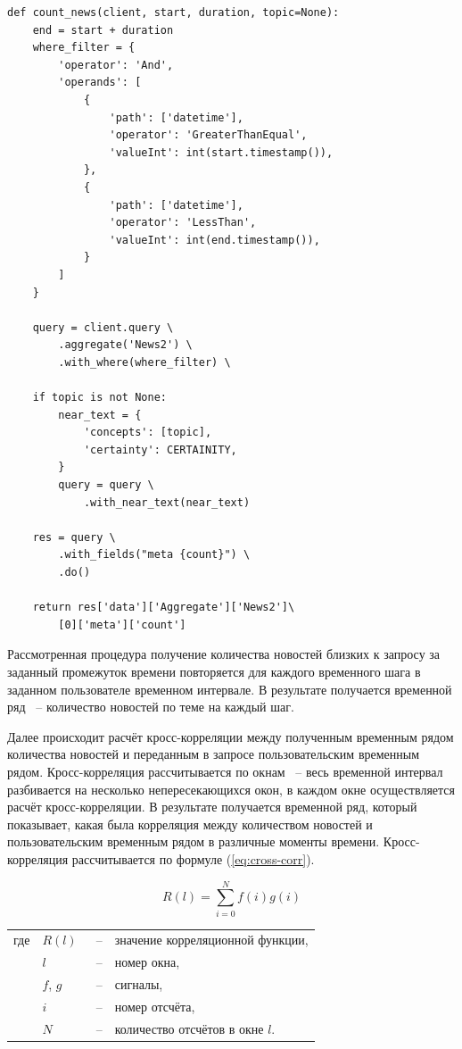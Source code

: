 \begin{lstlisting}
def count_news(client, start, duration, topic=None):
    end = start + duration
    where_filter = {
        'operator': 'And',
        'operands': [
            {
                'path': ['datetime'],
                'operator': 'GreaterThanEqual',
                'valueInt': int(start.timestamp()),
            },
            {
                'path': ['datetime'],
                'operator': 'LessThan',
                'valueInt': int(end.timestamp()),
            }
        ]
    }

    query = client.query \
        .aggregate('News2') \
        .with_where(where_filter) \

    if topic is not None:
        near_text = {
            'concepts': [topic],
            'certainty': CERTAINITY,
        }
        query = query \
            .with_near_text(near_text)

    res = query \
        .with_fields("meta {count}") \
        .do()

    return res['data']['Aggregate']['News2']\
        [0]['meta']['count']
\end{lstlisting}

Рассмотренная процедура получение количества новостей близких к запросу за заданный промежуток времени повторяется для каждого временного шага в заданном пользователе временном интервале. В результате получается временной ряд ~-- количество новостей по теме на каждый шаг.

Далее происходит расчёт кросс-корреляции между полученным временным рядом количества новостей и переданным в запросе пользовательским временным рядом. Кросс-корреляция рассчитывается по окнам ~-- весь временной интервал разбивается на несколько непересекающихся окон, в каждом окне осуществляется расчёт кросс-корреляции. В результате получается временной ряд, который показывает, какая была корреляция между количеством новостей и пользовательским временным рядом в различные моменты времени. Кросс-корреляция рассчитывается по формуле (\ref{eq:cross-corr}).

\begin{equation}
    R(l) = \sum_{i=0}^N{f(i)g(i)}
    \label{eq:cross-corr}
\end{equation}

\noindent\begin{tabularx}{\linewidth}{lllX}
    где & $R(l)$   &~--& значение корреляционной функции, \\
        & $l$      &~--& номер окна, \\
        & $f$, $g$ &~--& сигналы, \\
        & $i$      &~--& номер отсчёта, \\
        & $N$      &~--& количество отсчётов в окне $l$. \\
\end{tabularx}

